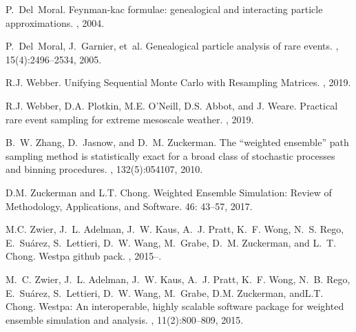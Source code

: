 \documentclass[11pt,letterpaper]{amsart}
\theoremstyle{plain}
\theoremstyle{definition}
\numberwithin{equation}{section}
\begin{document}
\begin{thebibliography}{}
P.~Del~Moral.
\newblock Feynman-kac formulae: genealogical and interacting particle
  approximations.
, 2004.
       
       
P.~Del~Moral, J.~Garnier, et~al.
\newblock Genealogical particle analysis of rare events.
, 15(4):2496--2534, 2005.


R.J. Webber.
\newblock  Unifying Sequential Monte Carlo with Resampling Matrices.
, 2019.

R.J. Webber, D.A. Plotkin, M.E. O'Neill, D.S. Abbot, and J. Weare.  
\newblock Practical rare event sampling for extreme mesoscale weather.
, 2019.

B.~W. Zhang, D.~Jasnow, and D.~M. Zuckerman.
\newblock The “weighted ensemble” path sampling method is statistically
  exact for a broad class of stochastic processes and binning procedures.
, 132(5):054107, 2010.

D.M. Zuckerman and L.T. Chong. 
\newblock
Weighted Ensemble Simulation: Review of Methodology, Applications, and Software. 
 46: 43--57, 2017.

M.C. Zwier, J.~L. Adelman, J.~W. Kaus, A.~J. Pratt, K.~F. Wong, N.~S. Rego,
  E.~Su{\'a}rez, S.~Lettieri, D.~W. Wang, M.~Grabe, D.~M. Zuckerman, and L.~T.
  Chong.
\newblock Westpa github pack.
, 2015--.

M.~C. Zwier, J.~L. Adelman, J.~W. Kaus, A.~J. Pratt, K.~F. Wong, N.~B. Rego,
  E.~Su{\'a}rez, S.~Lettieri, D.~W. Wang, M.~Grabe, D.M. Zuckerman, andL.T. Chong.
\newblock Westpa: An interoperable, highly scalable software package for
  weighted ensemble simulation and analysis.
, 11(2):800--809,
  2015.
       
       \end{thebibliography}
       
\end{document}
